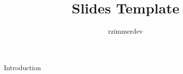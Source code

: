 \documentclass{beamer}
\title{Slides Template}
\author{rzimmerdev}
\begin{document}
\maketitle

\begin{frame}{Introduction}
\end{frame}
\end{document}

